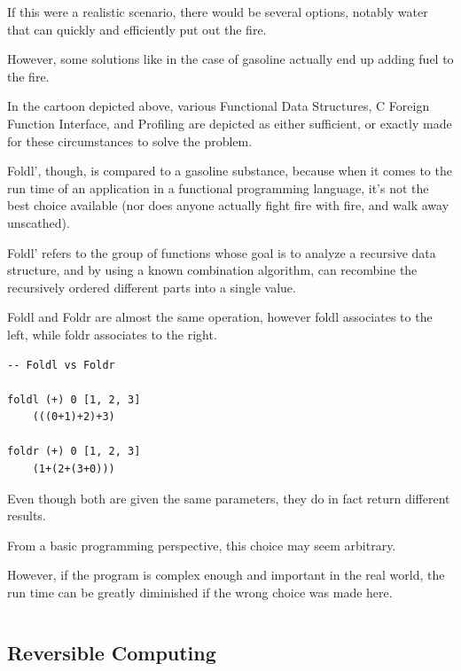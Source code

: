 \documentclass{article}
\begin{document}
\medskip\noindent
If this were a realistic scenario, there would be several options, notably water that can quickly and efficiently put out the fire. 

\medskip\noindent
However, some solutions like in the case of gasoline actually end up adding fuel to the fire. 

\medskip\noindent
In the cartoon depicted above, various Functional Data Structures, C Foreign Function Interface, and Profiling are depicted as either sufficient, or exactly made for these circumstances to solve the problem. 

\medskip\noindent
Foldl', though, is compared to a gasoline substance, because when it comes to the run time of an application in a functional programming language, it's not the best choice available (nor does anyone actually fight fire with fire, and walk away unscathed).

\medskip\noindent
Foldl' refers to the group of functions whose goal is to analyze a recursive data structure, and by using a known combination algorithm, can recombine the recursively ordered different parts into a single value. 

\medskip\noindent
Foldl and Foldr are almost the same operation, however foldl associates to the left, while foldr associates to the right\cite{HF}.

\medskip\noindent
\begin{lstlisting}
-- Foldl vs Foldr

foldl (+) 0 [1, 2, 3]
    (((0+1)+2)+3)
    
foldr (+) 0 [1, 2, 3]
    (1+(2+(3+0)))
\end{lstlisting}

\medskip\noindent
Even though both are given the same parameters, they do in fact return different results.

\medskip\noindent
From a basic programming perspective, this choice may seem arbitrary. 

\medskip\noindent
However, if the program is complex enough and important in the real world, the run time can be greatly diminished if the wrong choice was made here.

\medskip\medskip
\begin{lstlisting}
\end{lstlisting}
\medskip

\subsection{Reversible Computing}
\medskip\medskip
\hspace{\parindent} 
\end{document}
